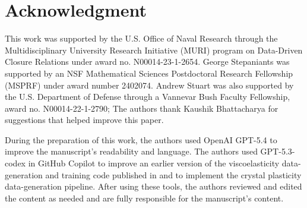 \section*{Acknowledgment}

This work was supported by the U.S. Office of Naval Research through the Multidisciplinary University Research Initiative (MURI) program on Data-Driven Closure Relations under award no. N00014-23-1-2654. George Stepaniants was supported by an NSF Mathematical Sciences Postdoctoral Research Fellowship (MSPRF) under award number 2402074. Andrew Stuart was also supported by the U.S. Department of Defense through a Vannevar Bush Faculty Fellowship, award no. N00014-22-1-2790;
 The authors thank Kaushik Bhattacharya for suggestions that helped improve this paper.

During the preparation of this work, the authors used OpenAI GPT-5.4 to improve the manuscript's readability and language. The authors used GPT-5.3-codex in GitHub Copilot to improve an earlier version of the viscoelasticity data-generation and training code published in \cite{bhattacharya2025learning} and to implement the crystal plasticity data-generation pipeline. After using these tools, the authors reviewed and edited the content as needed and are fully responsible for the manuscript's content.
